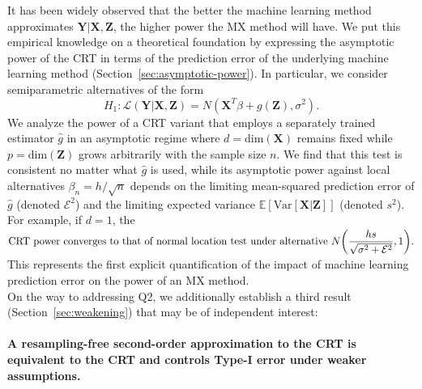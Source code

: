 \documentclass[12pt]{article}
\theoremstyle{definition}
\theoremstyle{remark}
\newcommand{\prx}{\bm X}
\newcommand{\prz}{\bm Z}
\newcommand{\pry}{{\bm Y}}
\begin{document}
It has been widely observed that the better the machine learning method approximates $\pry|\prx,\prz$, the higher power the MX method will have. We put this empirical knowledge on a theoretical foundation by expressing the asymptotic power of the CRT in terms of the prediction error of the underlying machine learning method (Section~\ref{sec:asymptotic-power}). In particular, we consider semiparametric alternatives of the form
\begin{equation}
	H_1: \mathcal L(\pry|\prx,\prz) = N(\prx^T\beta + g(\prz),\sigma^2).
	\label{parametric-alternative-intro}
\end{equation}
We analyze the power of a CRT variant that employs a separately trained estimator $\widehat g$ in an asymptotic regime where $d = \text{dim}(\prx)$ remains fixed while $p = \text{dim}(\prz)$ grows arbitrarily with the sample size $n$. We find that this test is consistent no matter what $\widehat g$ is used, while its asymptotic power against local alternatives $\beta_n = h/\sqrt{n}$ depends on the limiting mean-squared prediction error of $\widehat g$ (denoted $\mathcal E^2$) and the limiting expected variance $\mathbb E[\text{Var}[\prx | \prz]]$ (denoted $s^2$). For example, if $d = 1$, the
\begin{equation*}
	\begin{split}
		\text{CRT power converges to that of normal location test under alternative } N\smash{\left(\frac{hs}{\sqrt{\sigma^2 + \mathcal E^2}},1\right)}.
	\end{split}
\end{equation*}
This represents the first explicit quantification of the impact of machine learning prediction error on the power of an MX method. \\

On the way to addressing Q2, we additionally establish a third result (Section~\ref{sec:weakening}) that may be of independent interest:

\paragraph{A resampling-free second-order approximation to the CRT is equivalent to the CRT and controls Type-I error under weaker assumptions.}
\end{document}
